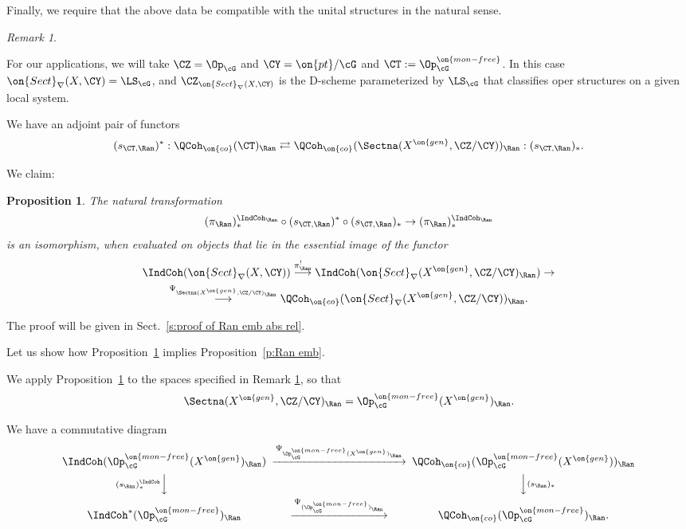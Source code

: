 \documentclass[9pt]{amsart}
\newtheorem{prop}[subsubsection]{Proposition}
\theoremstyle{remark}
\newtheorem{rem}[subsubsection]{Remark}
\theoremstyle{definition}
\theoremstyle{remark}
\newcommand{\secref}[1]{Sect.~\ref{#1}}
\newcommand{\propref}[1]{Proposition~\ref{#1}}
\numberwithin{equation}{section}
\begin{document}
Finally, we require that the above data be compatible with the unital structures in the natural sense. 

\begin{rem} \label{r:apply paradigm}

For our applications, we will take $\CZ=\Op_\cG$ and $\CY=\on{pt}/\cG$ and $\CT:=\Op^{\on{mon-free}}_\cG$.
In this case $\on{Sect}_\nabla(X,\CY)=\LS_\cG$, and $\CZ_{\on{Sect}_\nabla(X,\CY)}$ is the D-scheme
parameterized by $\LS_\cG$ that classifies oper structures on a given local system. 

\end{rem} 

\sssec{}

We have an adjoint pair of functors
$$(s_{\CT,\Ran})^*:{}\QCoh_{\on{co}}(\CT)_\Ran\rightleftarrows 
\QCoh_{\on{co}}(\Sectna(X^{\on{gen}},\CZ/\CY))_\Ran:(s_{\CT,\Ran})_*.$$

\sssec{}

We claim:

\begin{prop} \label{p:Ran emb abs rel}
The natural transformation
$$(\pi_\Ran)^{\IndCoh_\Ran}_*\circ (s_{\CT,\Ran})^*\circ (s_{\CT,\Ran})_*\to (\pi_\Ran)^{\IndCoh_\Ran}_*$$
is an isomorphism, when evaluated on objects that lie in the essential image of the functor
\begin{multline} \label{e:Ran emb abs rel}
\IndCoh(\on{Sect}_\nabla(X,\CY)) \overset{\pi_\Ran^!}\longrightarrow 
\IndCoh(\on{Sect}_\nabla(X^{\on{gen}},\CZ/\CY)_\Ran) \to \\
\overset{\Psi_{\Sectna(X^{\on{gen}},\CZ/\CY)_\Ran}}\longrightarrow
\QCoh_{\on{co}}(\on{Sect}_\nabla(X^{\on{gen}},\CZ/\CY))_\Ran.
\end{multline}
\end{prop}

The proof will be given in \secref{s:proof of Ran emb abs rel}.

\sssec{}

Let us show how \propref{p:Ran emb abs rel} implies \propref{p:Ran emb}. 

\medskip 

We apply \propref{p:Ran emb abs rel} to the spaces specified in Remark \ref{r:apply paradigm}, so that  
$$\Sectna(X^{\on{gen}},\CZ/\CY)_\Ran=\Op^{\on{mon-free}}_\cG(X^{\on{gen}})_\Ran.$$

\medskip

We have a commutative diagram 
\begin{equation} \label{e:IndCoh and QCoh loc and glob 1} 
\CD
\IndCoh(\Op^{\on{mon-free}}_\cG(X^{\on{gen}})_\Ran) @>{\Psi_{\Op^{\on{mon-free}}_\cG(X^{\on{gen}})_\Ran}}>> 
\QCoh_{\on{co}}(\Op^{\on{mon-free}}_\cG(X^{\on{gen}}))_\Ran  \\
@V{(s_\Ran)^{\IndCoh}_*}VV @VV{(s_\Ran)_*}V \\
\IndCoh^*(\Op^{\on{mon-free}}_\cG)_\Ran @>{\Psi_{(\Op^{\on{mon-free}}_\cG)_\Ran}}>> 
\QCoh_{\on{co}}(\Op^{\on{mon-free}}_\cG)_\Ran.
\endCD
\end{equation} 
\end{document}
